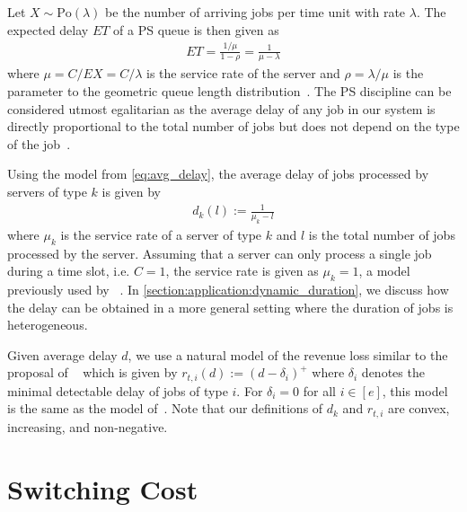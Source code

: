 Let $X \sim \text{Po}(\lambda)$ be the number of arriving jobs per time unit with rate $\lambda$. The expected delay $E T$ of a PS queue is then given as \begin{align}\label{eq:avg_delay}
    E T = \frac{1/\mu}{1-\rho} = \frac{1}{\mu - \lambda}
\end{align} where $\mu = C / E X = C / \lambda$ is the service rate of the server and $\rho = \lambda / \mu$ is the parameter to the geometric queue length distribution~\cite{Virtamo2007}. The PS discipline can be considered utmost egalitarian as the average delay of any job in our system is directly proportional to the total number of jobs but does not depend on the type of the job~\cite{Virtamo2007}.

Using the model from \cref{eq:avg_delay}, the average delay of jobs processed by servers of type $k$ is given by \begin{align}\label{eq:delay}
    d_{k}(l) := \frac{1}{\mu_k - l}
\end{align} where $\mu_k$ is the service rate of a server of type $k$ and $l$ is the total number of jobs processed by the server. Assuming that a server can only process a single job during a time slot, i.e. $C = 1$, the service rate is given as $\mu_k = 1$, a model previously used by \citeauthor*{Lin2011}~\cite{Lin2011, Lin2012}. In \cref{section:application:dynamic_duration}, we discuss how the delay can be obtained in a more general setting where the duration of jobs is heterogeneous.

Given average delay $d$, we use a natural model of the revenue loss similar to the proposal of \citeauthor*{Lin2011}~\cite{Lin2011} which is given by $r_{t,i}(d) := (d - \delta_i)^+$ where $\delta_i$ denotes the minimal detectable delay of jobs of type $i$. For $\delta_i = 0$ for all $i \in [e]$, this model is the same as the model of~\cite{Lin2012}. Note that our definitions of $d_k$ and $r_{t,i}$ are convex, increasing, and non-negative.

\section{Switching Cost}\label{section:application:switching_cost}

